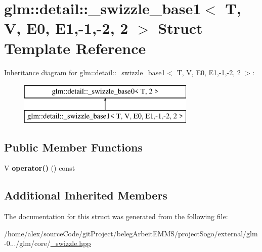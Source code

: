 \hypertarget{structglm_1_1detail_1_1__swizzle__base1_3_01T_00_01V_00_01E0_00_01E1_00-1_00-2_00_012_01_4}{\section{glm\-:\-:detail\-:\-:\-\_\-swizzle\-\_\-base1$<$ T, V, E0, E1,-\/1,-\/2, 2 $>$ Struct Template Reference}
\label{structglm_1_1detail_1_1__swizzle__base1_3_01T_00_01V_00_01E0_00_01E1_00-1_00-2_00_012_01_4}
}
Inheritance diagram for glm\-:\-:detail\-:\-:\-\_\-swizzle\-\_\-base1$<$ T, V, E0, E1,-\/1,-\/2, 2 $>$\-:\begin{figure}[H]
\begin{center}
\leavevmode
\includegraphics[height=2.000000cm]{structglm_1_1detail_1_1__swizzle__base1_3_01T_00_01V_00_01E0_00_01E1_00-1_00-2_00_012_01_4}
\end{center}
\end{figure}
\subsection*{Public Member Functions}
\begin{DoxyCompactItemize}
\item 
\hypertarget{structglm_1_1detail_1_1__swizzle__base1_3_01T_00_01V_00_01E0_00_01E1_00-1_00-2_00_012_01_4_ae62c208420fe971c7203cbea2a7b7481}{V {\bfseries operator()} () const }\label{structglm_1_1detail_1_1__swizzle__base1_3_01T_00_01V_00_01E0_00_01E1_00-1_00-2_00_012_01_4_ae62c208420fe971c7203cbea2a7b7481}

\end{DoxyCompactItemize}
\subsection*{Additional Inherited Members}


The documentation for this struct was generated from the following file\-:\begin{DoxyCompactItemize}
\item 
/home/alex/source\-Code/git\-Project/beleg\-Arbeit\-E\-M\-M\-S/project\-Sogo/external/glm-\/0.../glm/core/\hyperlink{__swizzle_8hpp}{\-\_\-swizzle.\-hpp}\end{DoxyCompactItemize}
